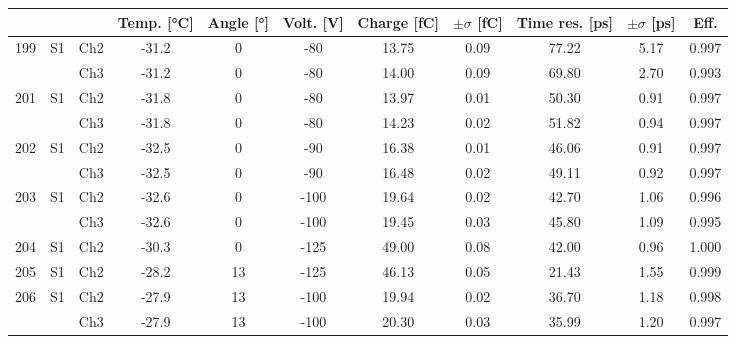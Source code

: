 \begin{tabular}{ccccccccccc}
\toprule
 &  &  & Temp. [°C] & Angle [°] & Volt. [V] & Charge [fC] & \(\pm\sigma\) [fC] & Time res. [ps] & \(\pm\sigma\) [ps] & Eff. \\
\midrule
199 & S1 & Ch2 & -31.2 & 0 & -80 & 13.75 & 0.09 & 77.22 & 5.17 & 0.997 \\
 &  & Ch3 & -31.2 & 0 & -80 & 14.00 & 0.09 & 69.80 & 2.70 & 0.993 \\
201 & S1 & Ch2 & -31.8 & 0 & -80 & 13.97 & 0.01 & 50.30 & 0.91 & 0.997 \\
 &  & Ch3 & -31.8 & 0 & -80 & 14.23 & 0.02 & 51.82 & 0.94 & 0.997 \\
202 & S1 & Ch2 & -32.5 & 0 & -90 & 16.38 & 0.01 & 46.06 & 0.91 & 0.997 \\
 &  & Ch3 & -32.5 & 0 & -90 & 16.48 & 0.02 & 49.11 & 0.92 & 0.997 \\
203 & S1 & Ch2 & -32.6 & 0 & -100 & 19.64 & 0.02 & 42.70 & 1.06 & 0.996 \\
 &  & Ch3 & -32.6 & 0 & -100 & 19.45 & 0.03 & 45.80 & 1.09 & 0.995 \\
204 & S1 & Ch2 & -30.3 & 0 & -125 & 49.00 & 0.08 & 42.00 & 0.96 & 1.000 \\
205 & S1 & Ch2 & -28.2 & 13 & -125 & 46.13 & 0.05 & 21.43 & 1.55 & 0.999 \\
206 & S1 & Ch2 & -27.9 & 13 & -100 & 19.94 & 0.02 & 36.70 & 1.18 & 0.998 \\
 &  & Ch3 & -27.9 & 13 & -100 & 20.30 & 0.03 & 35.99 & 1.20 & 0.997 \\
\bottomrule
\end{tabular}
